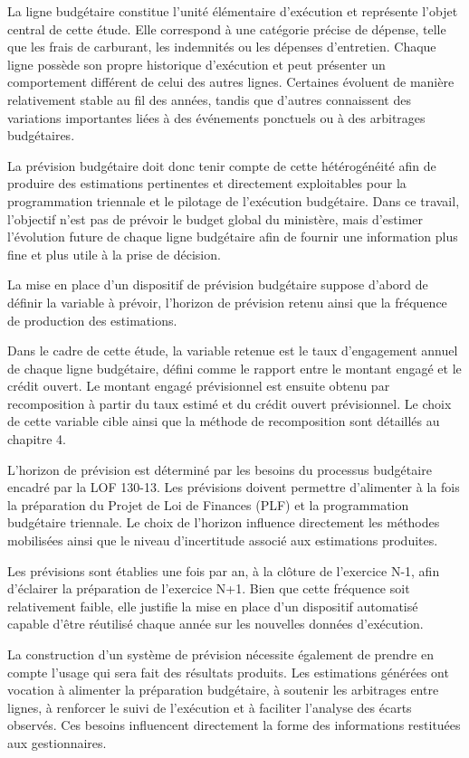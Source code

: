 La ligne budgétaire constitue l'unité élémentaire d'exécution et représente l'objet central de cette étude. Elle correspond à une catégorie précise de dépense, telle que les frais de carburant, les indemnités ou les dépenses d'entretien. Chaque ligne possède son propre historique d'exécution et peut présenter un comportement différent de celui des autres lignes. Certaines évoluent de manière relativement stable au fil des années, tandis que d'autres connaissent des variations importantes liées à des événements ponctuels ou à des arbitrages budgétaires.

La prévision budgétaire doit donc tenir compte de cette hétérogénéité afin de produire des estimations pertinentes et directement exploitables pour la programmation triennale et le pilotage de l'exécution budgétaire. Dans ce travail, l'objectif n'est pas de prévoir le budget global du ministère, mais d'estimer l'évolution future de chaque ligne budgétaire afin de fournir une information plus fine et plus utile à la prise de décision.

La mise en place d'un dispositif de prévision budgétaire suppose d'abord de définir la variable à prévoir, l'horizon de prévision retenu ainsi que la fréquence de production des estimations.

Dans le cadre de cette étude, la variable retenue est le taux d'engagement annuel de chaque ligne budgétaire, défini comme le rapport entre le montant engagé et le crédit ouvert. Le montant engagé prévisionnel est ensuite obtenu par recomposition à partir du taux estimé et du crédit ouvert prévisionnel. Le choix de cette variable cible ainsi que la méthode de recomposition sont détaillés au chapitre 4.

L'horizon de prévision est déterminé par les besoins du processus budgétaire encadré par la LOF 130-13. Les prévisions doivent permettre d'alimenter à la fois la préparation du Projet de Loi de Finances (PLF) et la programmation budgétaire triennale. Le choix de l'horizon influence directement les méthodes mobilisées ainsi que le niveau d'incertitude associé aux estimations produites.

Les prévisions sont établies une fois par an, à la clôture de l'exercice N-1, afin d'éclairer la préparation de l'exercice N+1. Bien que cette fréquence soit relativement faible, elle justifie la mise en place d'un dispositif automatisé capable d'être réutilisé chaque année sur les nouvelles données d'exécution.

La construction d'un système de prévision nécessite également de prendre en compte l'usage qui sera fait des résultats produits. Les estimations générées ont vocation à alimenter la préparation budgétaire, à soutenir les arbitrages entre lignes, à renforcer le suivi de l'exécution et à faciliter l'analyse des écarts observés. Ces besoins influencent directement la forme des informations restituées aux gestionnaires.

